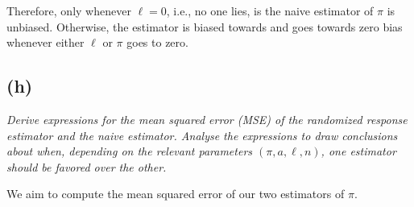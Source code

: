 Therefore, only whenever $\ell = 0$, i.e., no one lies, is the naive estimator of $\pi$ is unbiased.
Otherwise, the estimator is biased towards and goes towards zero bias whenever either $\ell$ or $\pi$ goes to zero.


\subsection{(h)}
\textit{Derive expressions for the mean squared error (MSE) of the randomized response estimator and the naive estimator. Analyse the expressions to draw conclusions about when, depending on the relevant parameters $(\pi, a, \ell, n)$, one estimator should be favored over the other.}

We aim to compute the mean squared error of our two estimators of $\pi$.

